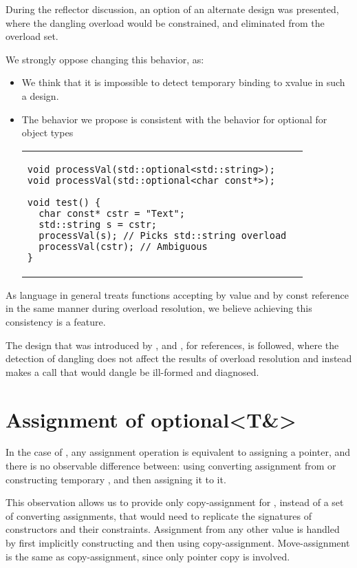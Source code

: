 \documentclass[a4paper,10pt,oneside,openany,final,article]{memoir}
\begin{document}
During the reflector discussion, an option of an alternate design was presented, where the dangling overload would be constrained, and eliminated from the overload set.

We strongly oppose changing this behavior, as:
\begin{itemize}
\item We think that it is impossible to detect temporary binding to xvalue in such a design.

\item The behavior we propose is consistent with the behavior for optional for object types

\begin{tabular}{ lr }
  \begin{minipage}[t]{0.45\columnwidth}
    \begin{verbatim}
void processVal(std::optional<std::string>);
void processVal(std::optional<char const*>);

void test() {
  char const* cstr = "Text";
  std::string s = cstr;
  processVal(s); // Picks std::string overload
  processVal(cstr); // Ambiguous
}
\end{verbatim}
\end{minipage}
\end{tabular}
\end{itemize}
As language in general treats functions accepting by value and by const reference in the same manner during overload resolution, we believe achieving this consistency is a feature.

The design that was introduced by , and , for references, is followed, where the detection of dangling does not affect the results of overload resolution and instead makes a call that would dangle be ill-formed and diagnosed.

\section{Assignment of optional<T\&>}

In the case of , any assignment operation is equivalent to assigning a pointer, and there is no observable difference between:
using converting assignment from  or 
constructing temporary , and then assigning it to it.

This observation allows us to provide only copy-assignment for , instead of a set of converting assignments, that would need to replicate the signatures of constructors and their constraints. Assignment from any other value is handled by first implicitly constructing  and then using copy-assignment. Move-assignment is the same as copy-assignment, since only pointer copy is involved.
\end{document}
